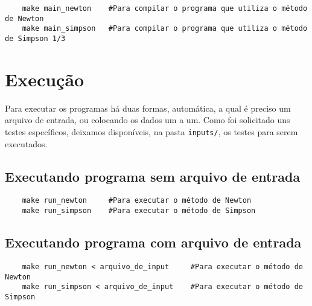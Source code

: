 \begin{verbatim}
	make main_newton    #Para compilar o programa que utiliza o método de Newton
	make main_simpson   #Para compilar o programa que utiliza o método de Simpson 1/3
\end{verbatim}

\section{Execução}
Para executar os programas há duas formas, automática, a qual é preciso um
arquivo de entrada, ou colocando os dados um a um. Como foi solicitado uns
testes específicos, deixamos disponíveis, na pasta \texttt{inputs/}, os testes
para serem executados.

\subsection*{Executando programa sem arquivo de entrada}
\begin{verbatim}
	make run_newton     #Para executar o método de Newton
	make run_simpson    #Para executar o método de Simpson
\end{verbatim}

\subsection*{Executando programa com arquivo de entrada}
\label{subsec:ex_com}
\begin{verbatim}
	make run_newton < arquivo_de_input     #Para executar o método de Newton
	make run_simpson < arquivo_de_input    #Para executar o método de Simpson
\end{verbatim}

